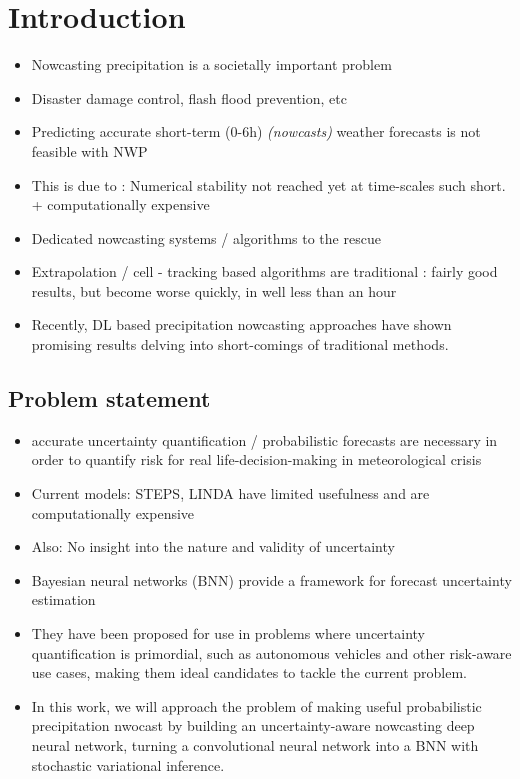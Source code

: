 \chapter{Introduction}
\label{chapter:intro}

\begin{itemize}
	\item Nowcasting precipitation is a societally important problem
	\item Disaster damage control, flash flood prevention, etc
	\item Predicting accurate short-term (0-6h) \textit{(nowcasts)} weather forecasts is not feasible with NWP
	\item This is due to : Numerical stability not reached yet at time-scales such short. + computationally expensive
	\item Dedicated nowcasting systems / algorithms to the rescue
	\item Extrapolation / cell - tracking based algorithms are traditional : fairly good results, but become worse quickly, in well less than an hour
	\item Recently, DL based precipitation nowcasting approaches have shown promising results delving into short-comings of traditional methods.
\end{itemize}




\section{Problem statement}
\begin{itemize}
\item accurate uncertainty quantification / probabilistic forecasts are necessary in order to quantify risk for real life-decision-making in meteorological crisis
\item Current models: STEPS, LINDA have limited usefulness and are computationally expensive
\item Also: No insight into the nature and validity of uncertainty
\item Bayesian neural networks (BNN) provide a framework for forecast uncertainty estimation
\item They have been proposed for use in problems where uncertainty quantification is primordial, such as autonomous vehicles and other risk-aware use cases, making them ideal candidates to tackle the current problem.
\item In this work, we will approach the problem of making useful probabilistic precipitation nwocast by building an uncertainty-aware nowcasting deep neural network, turning a convolutional neural network into a BNN with stochastic variational inference. 
\end{itemize}

